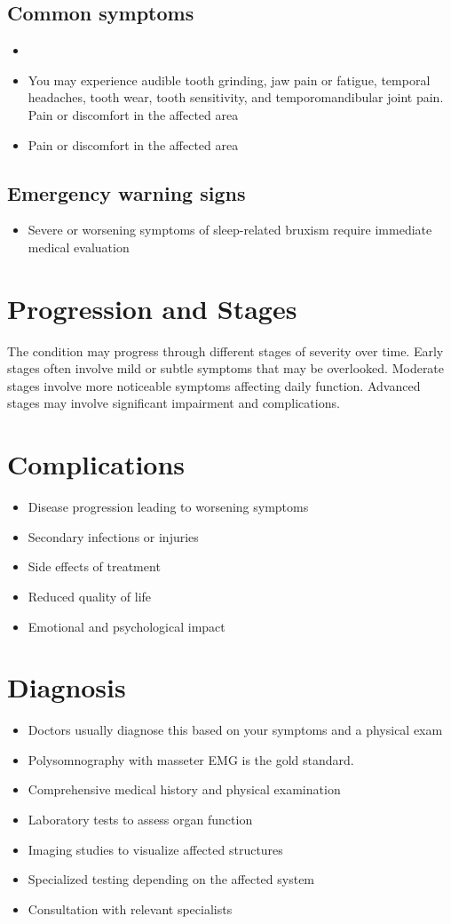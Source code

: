 \subsection{Common symptoms}
\begin{itemize}[noitemsep]
  \item \item You may experience audible tooth grinding, jaw pain or fatigue, temporal headaches, tooth wear, tooth sensitivity, and temporomandibular joint pain. Pain or discomfort in the affected area    \item Pain or discomfort in the affected area
  \end{itemize}

\subsection{Emergency warning signs}
\begin{itemize}[noitemsep]
  \item Severe or worsening symptoms of sleep-related bruxism require immediate medical evaluation
\end{itemize}
\section{Progression and Stages}
The condition may progress through different stages of severity over time. Early stages often involve mild or subtle symptoms that may be overlooked. Moderate stages involve more noticeable symptoms affecting daily function. Advanced stages may involve significant impairment and complications.
\section{Complications}
\begin{itemize}[noitemsep]
  \item Disease progression leading to worsening symptoms
  \item Secondary infections or injuries
  \item Side effects of treatment
  \item Reduced quality of life
  \item Emotional and psychological impact
\end{itemize}
\section{Diagnosis}
\begin{itemize}[noitemsep]
  \item Doctors usually diagnose this based on your symptoms and a physical exam
  \item Polysomnography with masseter EMG is the gold standard.
  \item Comprehensive medical history and physical examination
  \item Laboratory tests to assess organ function
  \item Imaging studies to visualize affected structures
  \item Specialized testing depending on the affected system
  \item Consultation with relevant specialists
\end{itemize}
